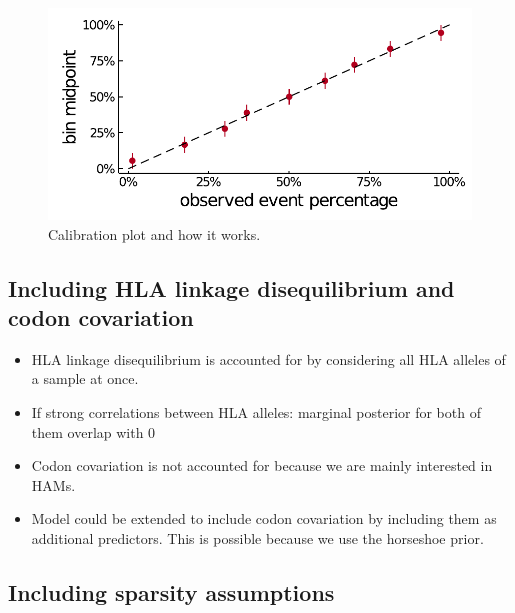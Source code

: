 \documentclass[fleqn,11pt]{SelfArx} %
\begin{document}
\begin{figure}[!ht]
  \includegraphics[width=1\linewidth]{plots/phylogeny_calibration.pdf}
  \caption{Calibration plot and how it works.}
\end{figure}

\subsection*{Including HLA linkage disequilibrium and codon covariation}

\begin{itemize}
  \item HLA linkage disequilibrium is accounted for by considering all HLA alleles of a sample at once.
  \item If strong correlations between HLA alleles: marginal posterior for both of them overlap with 0
  \item Codon covariation is not accounted for because we are mainly interested in HAMs.
  \item Model could be extended to include codon covariation by including them as additional predictors. This is possible because we use the horseshoe prior.
\end{itemize}

\subsection*{Including sparsity assumptions}
\end{document}
